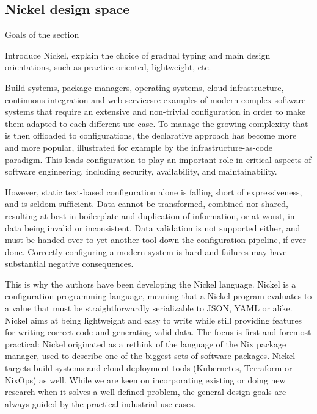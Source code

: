 \documentclass[sigplan,10pt,review,anonymous]{acmart}
\newcommand{\resolved}[2]{}
\begin{document}
\subsection{Nickel design space}

{\color{red}Goals of the section

Introduce Nickel, explain the choice of gradual
typing and main design orientations, such as practice-oriented, lightweight,
etc.\vspace{0.5cm}}

Build systems, package managers, operating systems, cloud infrastructure,
continuous integration and web services\resolved{Also continuous integration}
are examples of modern complex software systems that require an extensive and
non-trivial configuration in order to make them adapted to each different
use-case. To manage the growing complexity that is then offloaded to
configurations, the declarative approach has become more and more popular,
illustrated for example by the infrastructure-as-code paradigm. This leads
configuration to play an important role in critical aspects of software
engineering, including security, availability, and maintainability.

However, static text-based configuration alone is falling short of
expressiveness, and is seldom sufficient. Data cannot be transformed, combined
nor shared, resulting at best in boilerplate and duplication of information, or
at worst, in data being invalid or inconsistent. Data validation is not
supported either, and must be handed over to yet another tool down the
configuration pipeline, if ever done. Correctly configuring a modern system is
hard and failures may have substantial negative consequences.

This is why the authors have been developing the Nickel
language\cite{NickelRepo}. Nickel is a configuration programming language,
meaning that a Nickel program evaluates to a value that must be
straightforwardly serializable to JSON, YAML or alike. Nickel aims at being
lightweight and easy to write while still providing features for writing correct
code and generating valid data. The focus is first and foremost practical:
Nickel originated as a rethink of the language of the Nix package manager, used
to describe one of the biggest sets of software packages\cite{repology}.  Nickel
targets build systems and cloud deployment tools (Kubernetes, Terraform or
NixOps) as well. While we are keen on incorporating existing or doing new
research when it solves a well-defined problem, the general design goals are
always guided by the practical industrial use cases.
\end{document}
